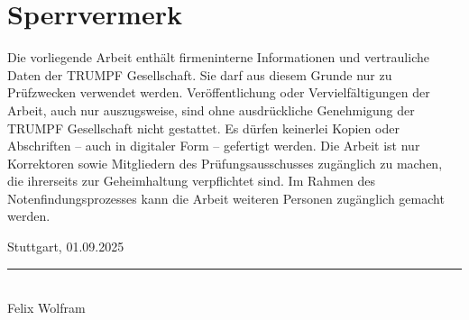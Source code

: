 \thispagestyle{empty}
\section*{Sperrvermerk}

\vspace*{2em}
 
Die vorliegende Arbeit enthält firmeninterne Informationen und vertrauliche Daten der TRUMPF
Gesellschaft. Sie darf aus diesem Grunde nur zu Prüfzwecken verwendet werden. Veröffentlichung oder Vervielfältigungen der Arbeit, auch nur auszugsweise, sind ohne ausdrückliche Genehmigung der TRUMPF Gesellschaft nicht gestattet.
Es dürfen keinerlei Kopien oder Abschriften – auch in digitaler Form – gefertigt werden. Die Arbeit ist nur Korrektoren sowie Mitgliedern des Prüfungsausschusses zugänglich zu machen, die ihrerseits zur Geheimhaltung verpflichtet
sind. Im Rahmen des Notenfindungsprozesses kann die Arbeit weiteren Personen zugänglich gemacht werden.

 
\vspace{3em}

Stuttgart, 01.09.2025
\vspace{4em}
 
\rule{6cm}{0.4pt}\\
Felix Wolfram